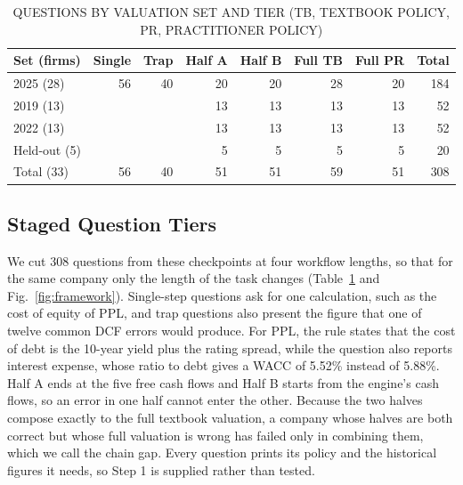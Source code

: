 \documentclass[conference]{IEEEtran}
\begin{document}
\begin{table}[t]
\caption{QUESTIONS BY VALUATION SET AND TIER (TB, TEXTBOOK POLICY, PR, PRACTITIONER POLICY)}
\centering
\scriptsize
\renewcommand{\arraystretch}{0.9}
\setlength{\tabcolsep}{3pt}
\begin{tabular}{|l|r|r|r|r|r|r|r|}
\hline
\textbf{Set (firms)} & \textbf{Single} & \textbf{Trap} & \textbf{Half A} & \textbf{Half B} & \textbf{Full TB} & \textbf{Full PR} & \textbf{Total} \\ \hline
2025 (28) & 56 & 40 & 20 & 20 & 28 & 20 & 184 \\
2019 (13) & & & 13 & 13 & 13 & 13 & 52 \\
2022 (13) & & & 13 & 13 & 13 & 13 & 52 \\
Held-out (5) & & & 5 & 5 & 5 & 5 & 20 \\ \hline
Total (33) & 56 & 40 & 51 & 51 & 59 & 51 & 308 \\ \hline
\end{tabular}
\label{tab:data}
\end{table}

\subsection{Staged Question Tiers}\label{sec:tiers}
We cut 308 questions from these checkpoints at four workflow lengths, so that for the same company only the length of the task changes (Table~\ref{tab:data} and Fig.~\ref{fig:framework}). Single-step questions ask for one calculation, such as the cost of equity of PPL, and trap questions also present the figure that one of twelve common DCF errors would produce. For PPL, the rule states that the cost of debt is the 10-year yield plus the rating spread, while the question also reports interest expense, whose ratio to debt gives a WACC of 5.52\% instead of 5.88\%. Half A ends at the five free cash flows and Half B starts from the engine's cash flows, so an error in one half cannot enter the other. Because the two halves compose exactly to the full textbook valuation, a company whose halves are both correct but whose full valuation is wrong has failed only in combining them, which we call the chain gap. Every question prints its policy and the historical figures it needs, so Step 1 is supplied rather than tested.
\end{document}
